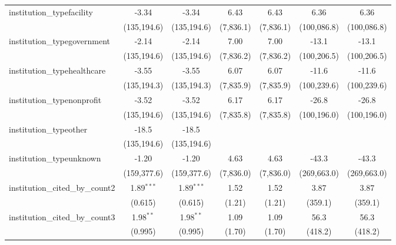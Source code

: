 \begin{tabular}{lcccccc}
   institution\_typefacility             & -3.34        & -3.34        & 6.43          & 6.43          & 6.36        & 6.36\\   
                                         & (135,194.6)  & (135,194.6)  & (7,836.1)     & (7,836.1)     & (100,086.8) & (100,086.8)\\   
   institution\_typegovernment           & -2.14        & -2.14        & 7.00          & 7.00          & -13.1       & -13.1\\   
                                         & (135,194.6)  & (135,194.6)  & (7,836.2)     & (7,836.2)     & (100,206.5) & (100,206.5)\\   
   institution\_typehealthcare           & -3.55        & -3.55        & 6.07          & 6.07          & -11.6       & -11.6\\   
                                         & (135,194.3)  & (135,194.3)  & (7,835.9)     & (7,835.9)     & (100,239.6) & (100,239.6)\\   
   institution\_typenonprofit            & -3.52        & -3.52        & 6.17          & 6.17          & -26.8       & -26.8\\   
                                         & (135,194.6)  & (135,194.6)  & (7,835.8)     & (7,835.8)     & (100,196.0) & (100,196.0)\\   
   institution\_typeother                & -18.5        & -18.5        &               &               &             &   \\   
                                         & (135,194.6)  & (135,194.6)  &               &               &             &   \\   
   institution\_typeunknown              & -1.20        & -1.20        & 4.63          & 4.63          & -43.3       & -43.3\\   
                                         & (159,377.6)  & (159,377.6)  & (7,836.0)     & (7,836.0)     & (269,663.0) & (269,663.0)\\   
   institution\_cited\_by\_count2        & 1.89$^{***}$ & 1.89$^{***}$ & 1.52          & 1.52          & 3.87        & 3.87\\   
                                         & (0.615)      & (0.615)      & (1.21)        & (1.21)        & (359.1)     & (359.1)\\   
   institution\_cited\_by\_count3        & 1.98$^{**}$  & 1.98$^{**}$  & 1.09          & 1.09          & 56.3        & 56.3\\   
                                         & (0.995)      & (0.995)      & (1.70)        & (1.70)        & (418.2)     & (418.2)\\   

\end{tabular}
